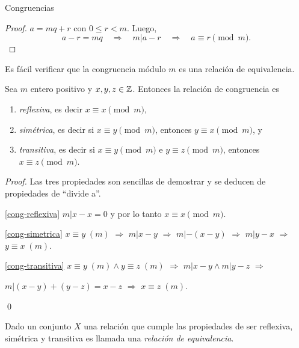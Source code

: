 \begin{section}{Congruencias}
\begin{proof}
     $a=mq+r$  con $0 \le r <m$. Luego,
     $$a-r = mq \quad \Rightarrow \quad m|a-r\quad \Rightarrow \quad a\equiv r \pmod{m}.$$ 
\end{proof}

Es fácil verificar que la {congruencia módulo} $m$ es una relación de equivalencia. 

\begin{proposicion} Sea $m$ entero positivo y $x,y,z \in {\mathbb Z}$. Entonces la relación de congruencia es
    \begin{enumerate}[label=\textit{\alph*)}]
        \item\label{cong-reflexiva}
        \textit{{reflexiva}}, es decir $x\equiv x\pmod{m}$,
        \item\label{cong-simetrica}
        \textit{{simétrica}}, es decir si $x \equiv y \pmod{m}$, entonces
        $y \equiv x \pmod{m}$, y 
        \item\label{cong-transitiva}
        \textit{{ transitiva}}, es decir si $x\equiv y \pmod{m}$ e
        $y\equiv z \pmod{m}$, entonces $x\equiv z \pmod{m}$.
        \end{enumerate}
\end{proposicion}

\begin{proof} Las tres propiedades son sencillas de demostrar y se deducen de propiedades de ``divide a''.

    \ref{cong-reflexiva}  $m| x-x =0$  y por lo tanto $x\equiv x\pmod{m}$.

    \ref{cong-simetrica} $x \equiv y\;(m)$ $\Rightarrow$ $m|x-y$ $\Rightarrow$  $m|-(x-y)$   $\Rightarrow$  $m|y-x$ $\Rightarrow$ $y \equiv x\; (m)$.

    \ref{cong-transitiva} $x \equiv y \;(m) \wedge y \equiv z \;(m)$ \;  $\Rightarrow$ \; $m|x-y \wedge m|y-z$ \; $\Rightarrow$ \; 

    \quad$m |(x-y) + (y-z) = x -z$ \; $\Rightarrow$ \; $x \equiv z \;(m)$.
    
    \qed
\end{proof}

\begin{observacion*}\label{relacion-de-equivalencia}
    Dado un conjunto $X$ una relación que cumple las propiedades de ser reflexiva, simétrica y transitiva es llamada una \textit{relación de equivalencia}.


\end{observacion*}
\end{section}
